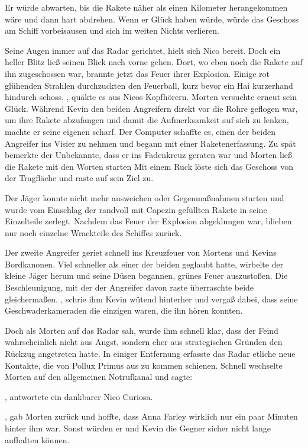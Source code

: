 \par

Er würde abwarten, bis die Rakete näher als einen Kilometer herangekommen wäre und dann hart abdrehen. Wenn er Glück haben würde, würde das Geschoss am Schiff vorbeisausen und sich im weiten Nichts verlieren.

\par

Seine Augen immer auf das Radar gerichtet, hielt sich Nico bereit. Doch ein heller Blitz ließ seinen Blick nach vorne gehen. Dort, wo eben noch die Rakete auf ihn zugeschossen war, brannte jetzt das Feuer ihrer Explosion. Einige rot glühenden Strahlen durchzuckten den Feuerball, kurz bevor ein Hai kurzerhand hindurch schoss.
, quäkte es aus Nicos Kopfhörern. 
\ortswechsel
Morten versuchte erneut sein Glück. Während Kevin den beiden Angreifern direkt vor die Rohre geflogen war, um ihre Rakete abzufangen und damit die Aufmerksamkeit auf sich zu lenken, machte er seine eigenen scharf. Der Computer schaffte es, einen der beiden Angreifer ins Visier zu nehmen und begann mit einer Raketenerfassung. Zu spät bemerkte der Unbekannte, dass er ins Fadenkreuz geraten war und Morten ließ die Rakete mit den Worten  starten Mit einem Ruck löste sich das Geschoss von der Tragfläche und raste auf sein Ziel zu.

\par

Der Jäger konnte nicht mehr ausweichen oder Gegenmaßnahmen starten und wurde vom Einschlag der randvoll mit Capezin gefüllten Rakete in seine Einzelteile zerlegt. Nachdem das Feuer der Explosion abgeklungen war, blieben nur noch einzelne Wrackteile des Schiffes zurück.

\par

Der zweite Angreifer geriet schnell ins Kreuzfeuer von Mortens und Kevins Bordkanonen. Viel schneller als einer der beiden geglaubt hatte, wirbelte der kleine Jäger herum und seine Düsen begannen, grünes Feuer auszustoßen. Die Beschleunigung, mit der der Angreifer davon raste überraschte beide gleichermaßen. , schrie ihm Kevin wütend hinterher und vergaß dabei, dass seine Geschwaderkameraden die einzigen waren, die ihn hören konnten.

\par

Doch als Morten auf das Radar sah, wurde ihm schnell klar, dass der Feind wahrscheinlich nicht aus Angst, sondern eher aus strategischen Gründen den Rückzug angetreten hatte. In einiger Entfernung erfasste das Radar etliche neue Kontakte, die von Pollux Primus aus zu kommen schienen. Schnell wechselte Morten auf den allgemeinen Notrufkanal und sagte: 

\par

, antwortete ein dankbarer Nico Curiosa. 

\par

, gab Morten zurück und hoffte, dass Anna Farley wirklich nur ein paar Minuten hinter ihm war. Sonst würden er und Kevin die Gegner sicher nicht lange aufhalten können.